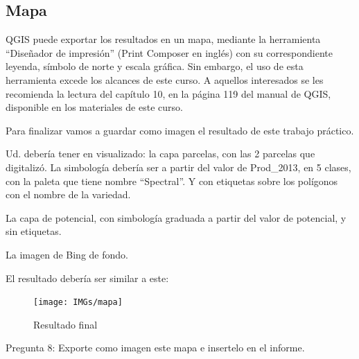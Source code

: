 \documentclass[onecolumn]{article}
\begin{document}
\subsection{Mapa}

QGIS puede exportar los resultados en un mapa, mediante la herramienta “Diseñador de impresión” (Print Composer en inglés) con su correspondiente leyenda, símbolo de norte y escala gráfica. Sin embargo, el uso de esta herramienta excede los alcances de este curso. A aquellos interesados se les recomienda la lectura del capítulo 10, en la página 119 del manual de QGIS, disponible en los materiales de este curso. 

Para finalizar vamos a guardar como imagen el resultado de este trabajo práctico. 

Ud. debería tener en visualizado: la capa parcelas, con las 2 parcelas que digitalizó. La simbología debería ser a partir del valor de Prod\_2013, en 5 clases, con la paleta que tiene nombre “Spectral”. Y con etiquetas sobre los polígonos con el nombre de la variedad. 

La capa de potencial, con simbología graduada a partir del valor de potencial, y sin etiquetas.

La imagen de Bing de fondo.

El resultado debería ser similar a este:

\begin{figure}[h]
	\centering
	\texttt{[image: IMGs/mapa]}
	\caption{Resultado final}
	\label{fig:interfaz}
\end{figure}

\begin{mdframed}[]
	Pregunta  8: Exporte como imagen este mapa e insertelo en el informe.
\end{mdframed}
\end{document}
